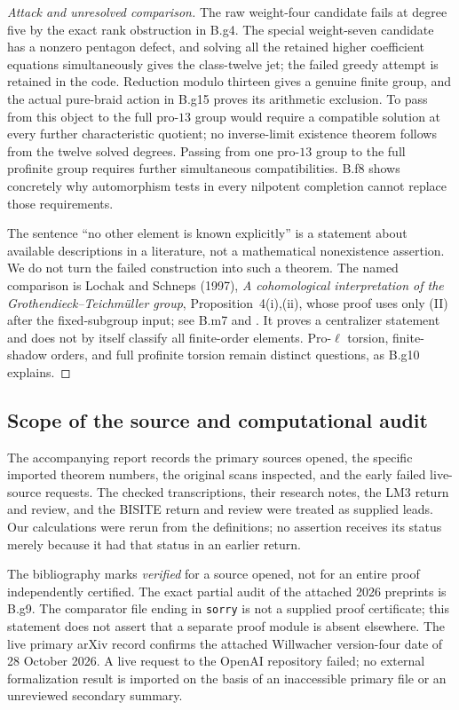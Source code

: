 \begin{proof}[Attack and unresolved comparison]
The raw weight-four candidate fails at degree five by the exact
rank obstruction in B.g4. The special weight-seven candidate has
a nonzero pentagon defect, and solving all the retained higher
coefficient equations simultaneously gives the class-twelve jet;
the failed greedy attempt is retained in the code. Reduction modulo
thirteen gives a genuine finite group, and the actual pure-braid
action in B.g15 proves its arithmetic exclusion. To pass from this
object to the full pro-$13$ group would require a compatible solution
at every further characteristic quotient; no inverse-limit existence
theorem follows from the twelve solved degrees. Passing from one
pro-$13$ group to the full profinite group requires further simultaneous
compatibilities. B.f8 shows concretely why automorphism tests in every
nilpotent completion cannot replace those requirements.

The sentence ``no other element is known explicitly'' is a statement
about available descriptions in a literature, not a mathematical
nonexistence assertion. We do not turn the failed construction into
such a theorem. The named comparison is Lochak and Schneps (1997),
\emph{A cohomological interpretation of the Grothendieck--Teichm\"uller
group}, Proposition~4(i),(ii), whose proof uses only (II) after the
fixed-subgroup input; see B.m7 and
\citet{LochakSchneps1997dictionary}. It proves a centralizer statement
and does not by itself classify all finite-order elements. Pro-$\ell$ torsion,
finite-shadow orders, and full profinite torsion remain distinct
questions, as B.g10 explains.
\end{proof}

\subsection*{Scope of the source and computational audit}
The accompanying report records the primary sources opened, the
specific imported theorem numbers, the original scans inspected, and
the early failed live-source requests. The checked transcriptions,
their research notes, the LM3 return and review, and the BISITE return
and review were treated as supplied leads. Our calculations were
rerun from the definitions; no assertion receives its status merely
because it had that status in an earlier return.

The bibliography marks \emph{verified} for a source opened, not for
an entire proof independently certified. The exact partial audit of
the attached 2026 preprints is B.g9. The comparator file ending in
\texttt{sorry} is not a supplied proof certificate; this statement
does not assert that a separate proof module is absent elsewhere.
The live primary arXiv record confirms the attached Willwacher
version-four date of 28 October 2026. A live request to the OpenAI
repository failed; no external formalization result is imported on
the basis of an inaccessible primary file or an unreviewed secondary
summary.

